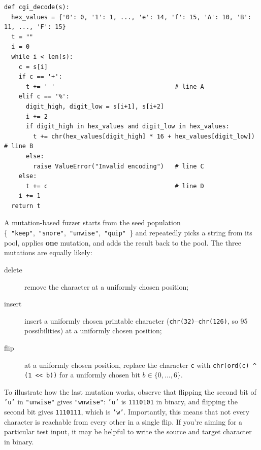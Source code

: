 \documentclass[addpoints, answers]{exam}
\newcommand{\Code}[1]{\texttt{#1}}
\begin{document}
\begin{questions}
\begin{verbatim}
def cgi_decode(s):
  hex_values = {'0': 0, '1': 1, ..., 'e': 14, 'f': 15, 'A': 10, 'B': 11, ..., 'F': 15}
  t = ""
  i = 0
  while i < len(s):
    c = s[i]
    if c == '+':
      t += ' '                                 # line A
    elif c == '%':
      digit_high, digit_low = s[i+1], s[i+2]
      i += 2
      if digit_high in hex_values and digit_low in hex_values:
        t += chr(hex_values[digit_high] * 16 + hex_values[digit_low])   # line B
      else:
        raise ValueError("Invalid encoding")   # line C
    else:
      t += c                                   # line D
    i += 1
  return t
\end{verbatim}

  A mutation-based fuzzer starts from the seed population
  \{\ \Code{"keep"},\ \Code{"snore"},\ \Code{"unwise"},\ \Code{"quip"}\ \}
  and repeatedly picks a string from its pool, applies \textbf{one}
  mutation, and adds the result back to the pool. The three mutations
  are equally likely:
  \begin{description}
  \item[delete] remove the character at a uniformly chosen position;
  \item[insert] insert a uniformly chosen printable character
    (\Code{chr(32)}--\Code{chr(126)}, so 95 possibilities) at a
    uniformly chosen position;
  \item[flip] at a uniformly chosen position, replace the character
    \Code{c} with \Code{chr(ord(c) ^ (1 << b))} for a uniformly chosen
    bit $b \in \{0,\ldots,6\}$.
  \end{description}

  \noindent To illustrate how the last mutation works, observe that
  flipping the second bit of \Code{'u'} in \Code{"unwise"} gives
  \Code{"wnwise"}: \Code{'u'} is \Code{1110101} in binary, and
  flipping the second bit gives \Code{1110111}, which is
  \Code{'w'}. Importantly, this means that not every character is
  reachable from every other in a single flip. If you're aiming for a
  particular test input, it may be helpful to write the source and
  target character in binary.

\end{questions}
\end{document}
